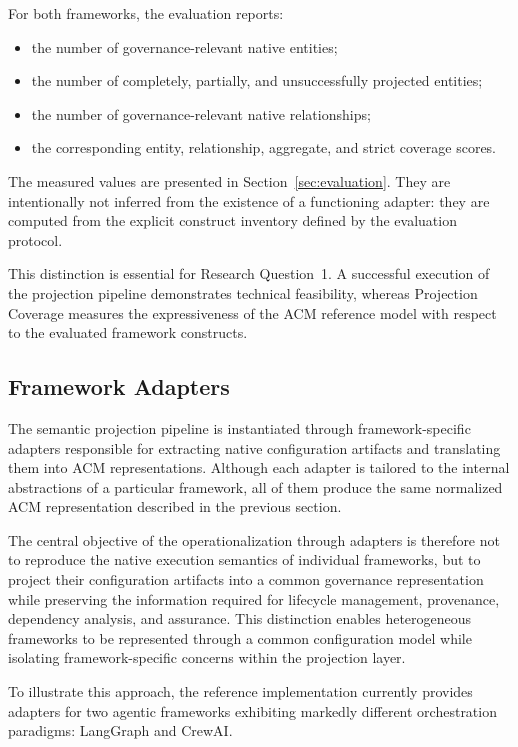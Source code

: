 \documentclass[10pt]{article}
\begin{document}
For both frameworks, the evaluation reports:

\begin{itemize}
    \item the number of governance-relevant native entities;
    \item the number of completely, partially, and unsuccessfully projected
    entities;
    \item the number of governance-relevant native relationships;
    \item the corresponding entity, relationship, aggregate, and strict
    coverage scores.
\end{itemize}

The measured values are presented in
Section~\ref{sec:evaluation}. They are intentionally not inferred from the
existence of a functioning adapter: they are computed from the explicit
construct inventory defined by the evaluation protocol.

This distinction is essential for Research Question~1. A successful execution
of the projection pipeline demonstrates technical feasibility, whereas
Projection Coverage measures the expressiveness of the ACM reference model with
respect to the evaluated framework constructs.

\subsection{Framework Adapters}
\label{sec:framework_adapters}

The semantic projection pipeline is instantiated through framework-specific adapters responsible for extracting native configuration artifacts and translating them into ACM representations. Although each adapter is tailored to the internal abstractions of a particular framework, all of them produce the same normalized ACM representation described in the previous section.

The central objective of the operationalization through adapters is therefore not to reproduce the native execution semantics of individual frameworks, but to project their configuration artifacts into a common governance representation while preserving the information required for lifecycle management, provenance, dependency analysis, and assurance. This distinction enables heterogeneous frameworks to be represented through a common configuration model while isolating framework-specific concerns within the projection layer.

To illustrate this approach, the reference implementation currently provides adapters for two agentic frameworks exhibiting markedly different orchestration paradigms: LangGraph and CrewAI.
\end{document}
